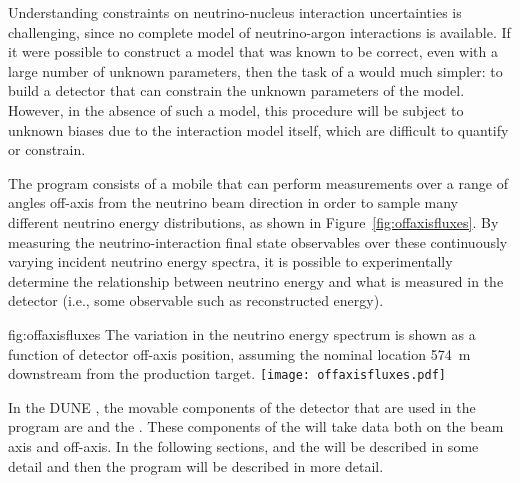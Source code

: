 Understanding   constraints on neutrino-nucleus interaction uncertainties is challenging, since no complete model of neutrino-argon interactions is available. If it were possible to construct a model that was known to be correct, even with a large number of unknown parameters, then the task of a   would much simpler: to build a detector that can constrain the unknown parameters of the model. However, in the absence of such a model, this procedure will be subject to unknown biases due to the interaction model itself, which are difficult to quantify or constrain.

The    program consists of a mobile   
that can perform measurements over a range of angles off-axis from the neutrino beam direction in order to sample many different neutrino energy distributions, as shown in Figure~\ref{fig:offaxisfluxes}. By measuring the neutrino-interaction final state observables over these continuously varying incident neutrino energy spectra, it is possible to experimentally determine the relationship between neutrino energy and what is measured in the detector (i.e., some observable such as reconstructed energy).


\begin{dunefigure}{fig:offaxisfluxes}
{The variation in the neutrino energy spectrum is shown as a function of detector off-axis position, assuming the nominal  location \SI{574}{m} downstream from the production target.}
\texttt{[image: offaxisfluxes.pdf]}
\end{dunefigure}


In the DUNE , the movable components of the detector that are used in the  program are  and the .  These components of the  will take data both on the beam axis and off-axis.  In the following sections,  and the  will be described in some detail and then the  program will be described in more detail.

